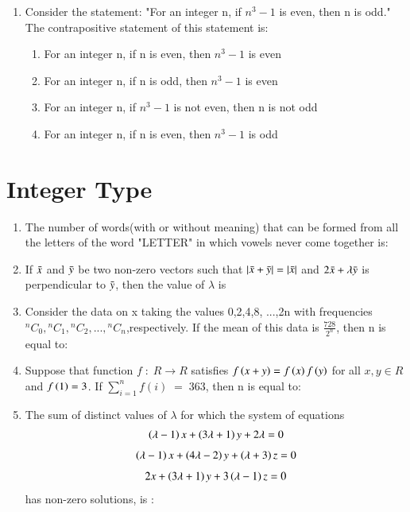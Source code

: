 \documentclass[journal,,12pt,onecolumn]{IEEEtran}
\theoremstyle{remark}
\begin{document}
\begin{enumerate}
 
 \item Consider the statement: "For an integer n, if $n^3-1$ is even, then n is odd." The contrapositive statement of this statement is:
 \begin{enumerate}
     \item For an integer n, if n is even, then $n^3-1$ is even
     \item For an integer n, if n is odd, then $n^3-1$ is even
     \item For an integer n, if $n^3-1$ is not even, then n is not odd
     \item For an integer n, if n is even, then $n^3-1$ is odd
 \end{enumerate}
 \end{enumerate}
\section*{Integer Type}
\begin{enumerate}
 \item The number of words(with or without meaning) that can be formed from all the letters of the word "LETTER" in which vowels never come together is:
 \item If $\Bar{x}$ and $\Bar{y}$ be two non-zero vectors such that $|\Bar{x}+\Bar{y}|=|\Bar{x}|$ and $2\Bar{x}+\lambda \Bar{y}$ is perpendicular to $\Bar{y}$, then the value of $\lambda$ is
 \item Consider the data on x taking the values 0,2,4,8, ...,2n with frequencies ${}^{n}C_{0}
,{}^{n}C_{1},{}^{n}C_{2}, ...,{}^{n}C_{n}$,respectively. If the mean of this data is $\frac{728}{2^n}$, then n is equal to:
 \item Suppose that function $f\;:\;R\rightarrow R$ satisfies $f\left(x+y\right)=f\left(x\right)f\left(y\right)$ for all $x,y \in R$ and $f\left(1\right)=3$. If $\sum_{i=1}^{n} f(i)\;=\;363$, then n is equal to:

 \item The sum of distinct values of $\lambda$ for which the system of equations 
 \begin{align*}
     \left(\lambda -1\right)x +\left(3\lambda+1\right)y+2\lambda =0
 \end{align*}
 \begin{align*}
     \left(\lambda -1\right)x +\left(4\lambda-2\right)y+\left(\lambda+3\right)z =0
 \end{align*}
 \begin{align*}
     2x +\left(3\lambda+1\right)y+3\left(\lambda-1\right)z =0
 \end{align*}
 has non-zero solutions, is :
 \end{enumerate}
 
\end{document}
